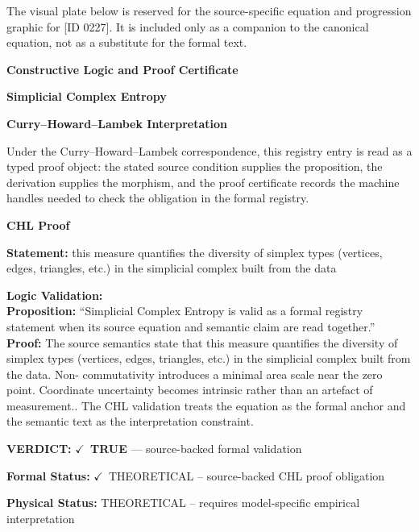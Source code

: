 \begingroup\footnotesize\sloppy
The visual plate below is reserved for the source-specific equation and progression graphic for [ID 0227]. It is included only as a companion to the canonical equation, not as a substitute for the formal text.
\par\endgroup
\ifTZPDarkEdition
{}
\fi

\clearpage
\begingroup\tzpsupportsetup
\noindent\textbf{\fontsize{10.8pt}{12.8pt}\selectfont [ID 0227] Constructive Logic and Proof Certificate}\par
\noindent\textbf{\fontsize{10pt}{12pt}\selectfont Simplicial Complex Entropy}\par
\vspace{0.45em}
\begingroup
\footnotesize
\setlength{\parskip}{0.22em}
\setlength{\parindent}{0pt}
\noindent\textbf{Curry--Howard--Lambek Interpretation}\par
Under the Curry--Howard--Lambek correspondence, this registry entry is read as a typed proof
object: the stated source condition supplies the proposition, the derivation supplies the
morphism, and the proof certificate records the machine handles needed to check the obligation
in the formal registry.

\vspace{0.45em}
\noindent\textbf{CHL Proof}\par
\textbf{Statement:} this measure quantifies the diversity of simplex types (vertices, edges, triangles,
etc.) in the simplicial complex built from the data

\textbf{Logic Validation:}\\
\textbf{Proposition:} ``Simplicial Complex Entropy is valid as a formal registry statement when its source
equation and semantic claim are read together.''\\
\textbf{Proof:} The source semantics state that this measure quantifies the diversity of simplex types
(vertices, edges, triangles, etc.) in the simplicial complex built from the data. Non-
commutativity introduces a minimal area scale near the zero point. Coordinate
uncertainty becomes intrinsic rather than an artefact of measurement.. The CHL
validation treats the equation as the formal anchor and the semantic text as the
interpretation constraint.

\textbf{VERDICT:} \ensuremath{\checkmark}\ \textbf{TRUE} --- source-backed formal validation

\textbf{Formal Status:} \ensuremath{\checkmark}\ THEORETICAL -- source-backed CHL proof obligation

\textbf{Physical Status:} THEORETICAL -- requires model-specific empirical interpretation
\par\vspace{0.45em}
\par
\ifTZPDarkEdition
{}
\fi
\endgroup
\endgroup
